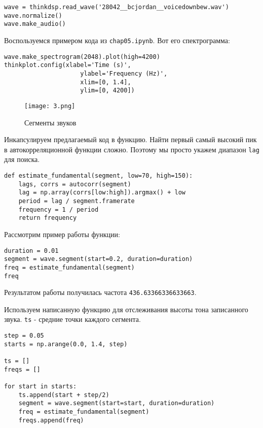 \documentclass[a4paper,12pt]{report}
\begin{document}
\begin{lstlisting}[caption=Загрузка звука]
wave = thinkdsp.read_wave('28042__bcjordan__voicedownbew.wav')
wave.normalize()
wave.make_audio()
\end{lstlisting}

Воспользуемся примером кода из \texttt{chap05.ipynb}. Вот его спектрограмма:

\begin{lstlisting}[caption=Спектрограмма звука]
wave.make_spectrogram(2048).plot(high=4200)
thinkplot.config(xlabel='Time (s)', 
                     ylabel='Frequency (Hz)',
                     xlim=[0, 1.4],
                     ylim=[0, 4200])
\end{lstlisting}

\begin{figure}[H]
        \centering
        \texttt{[image: 3.png]}
        \caption{Сегменты звуков}
        \label{fig:lab5_fig2_1}
\end{figure}

Инкапсулируем предлагаемый код в функцию. Найти первый самый высокий пик в автокорреляционной функции сложно. Поэтому мы просто укажем диапазон \texttt{lag} для поиска.

\begin{lstlisting}[caption=Инкапсуляция функции]
def estimate_fundamental(segment, low=70, high=150):
    lags, corrs = autocorr(segment)
    lag = np.array(corrs[low:high]).argmax() + low
    period = lag / segment.framerate
    frequency = 1 / period
    return frequency
\end{lstlisting}

Рассмотрим пример работы функции:

\begin{lstlisting}[caption=Пример работы функции]
duration = 0.01
segment = wave.segment(start=0.2, duration=duration)
freq = estimate_fundamental(segment)
freq
\end{lstlisting}

Результатом работы получилась частота \texttt{436.63366336633663}.

Используем написанную функцию для отслеживания высоты тона записанного звука. \texttt{ts} - средние точки каждого сегмента.

\begin{lstlisting}[caption=Отслеживание высоты тона]
step = 0.05
starts = np.arange(0.0, 1.4, step)

ts = []
freqs = []

for start in starts:
    ts.append(start + step/2)
    segment = wave.segment(start=start, duration=duration)
    freq = estimate_fundamental(segment)
    freqs.append(freq)
\end{lstlisting}
\end{document}

